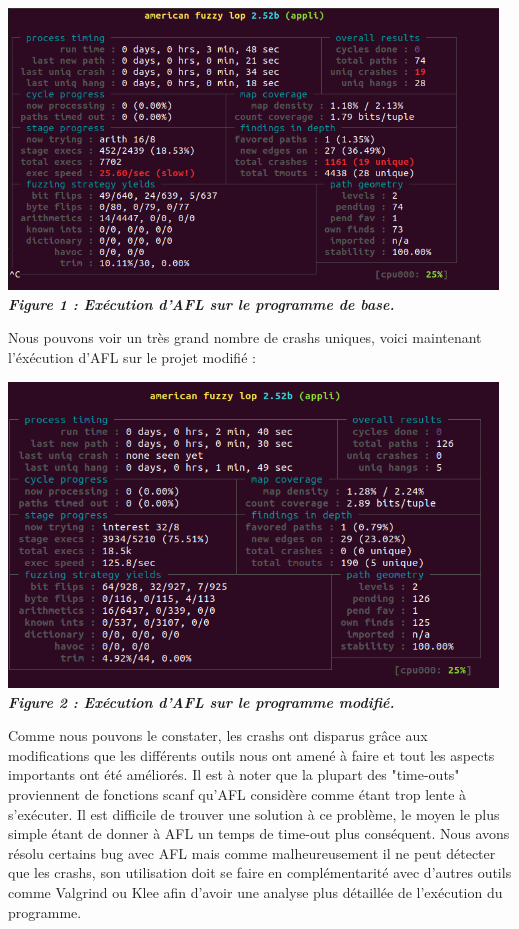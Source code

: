 \documentclass{report}
\begin{document}
\begin{center}
  \includegraphics[width=13cm]{captureafl1.png}
\textbf{\textit{Figure 1 : Exécution d'AFL sur le programme de base.}}
\end{center}

Nous pouvons voir un très grand nombre de crashs uniques, voici maintenant l'éxécution d'AFL sur le projet modifié : 

\begin{center}
  \includegraphics[width=13cm]{captureafl2.png}
\textbf{\textit{Figure 2 : Exécution d'AFL sur le programme modifié.}}
\end{center}
\newpage
Comme nous pouvons le constater, les crashs ont disparus grâce aux modifications que les différents outils nous ont amené à faire et tout les aspects importants ont été améliorés. Il est à noter que la plupart des "time-outs" proviennent de fonctions scanf qu'AFL considère comme étant trop lente à s'exécuter. Il est difficile de trouver une solution à ce problème, le moyen le plus simple étant de donner à AFL un temps de time-out plus conséquent. 
\newline
Nous avons résolu certains bug avec AFL mais comme malheureusement il ne peut détecter que les crashs, son utilisation doit se faire en complémentarité avec d'autres outils comme Valgrind ou Klee afin d'avoir une analyse plus détaillée de l'exécution du programme.
\end{document}
